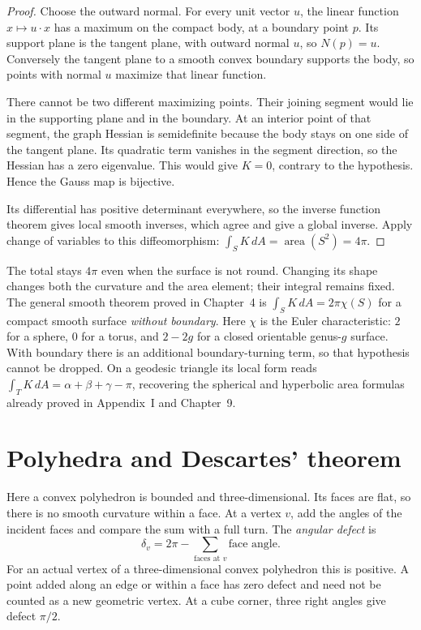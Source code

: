\begin{proof}
Choose the outward normal. For every unit vector $u$, the linear function $x\mapsto u\cdot x$ has a maximum on the compact body, at a boundary point $p$. Its support plane is the tangent plane, with outward normal $u$, so $N(p)=u$. Conversely the tangent plane to a smooth convex boundary supports the body, so points with normal $u$ maximize that linear function.

There cannot be two different maximizing points. Their joining segment would lie in the supporting plane and in the boundary. At an interior point of that segment, the graph Hessian is semidefinite because the body stays on one side of the tangent plane. Its quadratic term vanishes in the segment direction, so the Hessian has a zero eigenvalue. This would give $K=0$, contrary to the hypothesis. Hence the Gauss map is bijective.

Its differential has positive determinant everywhere, so the inverse function theorem gives local smooth inverses, which agree and give a global inverse. Apply change of variables to this diffeomorphism:
$\int_S K\,dA=\operatorname{area}(S^2)=4\pi$.
\end{proof}

The total stays $4\pi$ even when the surface is not round. Changing its shape changes both the curvature and the area element; their integral remains fixed. The general smooth theorem proved in Chapter~4 is $\int_S K\,dA=2\pi\chi(S)$ for a compact smooth surface \emph{without boundary}. Here $\chi$ is the Euler characteristic: $2$ for a sphere, $0$ for a torus, and $2-2g$ for a closed orientable genus-$g$ surface. With boundary there is an additional boundary-turning term, so that hypothesis cannot be dropped. On a geodesic triangle its local form reads $\int_TK\,dA=\alpha+\beta+\gamma-\pi$, recovering the spherical and hyperbolic area formulas already proved in Appendix~I and Chapter~9.

\section{Polyhedra and Descartes' theorem}

Here a convex polyhedron is bounded and three-dimensional. Its faces are flat, so there is no smooth curvature within a face. At a vertex $v$, add the angles of the incident faces and compare the sum with a full turn. The \emph{angular defect} is
\[
\delta_v=2\pi-\sum_{\text{faces at }v}\text{face angle}.
\]
For an actual vertex of a three-dimensional convex polyhedron this is positive. A point added along an edge or within a face has zero defect and need not be counted as a new geometric vertex. At a cube corner, three right angles give defect $\pi/2$.

